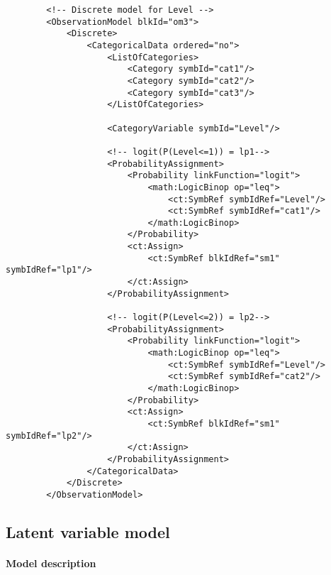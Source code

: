 \begin{lstlisting}
        <!-- Discrete model for Level -->
        <ObservationModel blkId="om3">
            <Discrete>
                <CategoricalData ordered="no">
                    <ListOfCategories>
                        <Category symbId="cat1"/>
                        <Category symbId="cat2"/>
                        <Category symbId="cat3"/>
                    </ListOfCategories>
                    
                    <CategoryVariable symbId="Level"/>
                    
                    <!-- logit(P(Level<=1)) = lp1-->
                    <ProbabilityAssignment>
                        <Probability linkFunction="logit">
                            <math:LogicBinop op="leq">
                                <ct:SymbRef symbIdRef="Level"/>
                                <ct:SymbRef symbIdRef="cat1"/>
                            </math:LogicBinop>
                        </Probability>
                        <ct:Assign>
                            <ct:SymbRef blkIdRef="sm1" symbIdRef="lp1"/>
                        </ct:Assign>
                    </ProbabilityAssignment>
                    
                    <!-- logit(P(Level<=2)) = lp2-->
                    <ProbabilityAssignment>
                        <Probability linkFunction="logit">
                            <math:LogicBinop op="leq">
                                <ct:SymbRef symbIdRef="Level"/>
                                <ct:SymbRef symbIdRef="cat2"/>
                            </math:LogicBinop>
                        </Probability>
                        <ct:Assign>
                            <ct:SymbRef blkIdRef="sm1" symbIdRef="lp2"/>
                        </ct:Assign>
                    </ProbabilityAssignment>
                </CategoricalData>
            </Discrete>
        </ObservationModel>
\end{lstlisting}



\subsection{Latent variable model}
\label{subsec:latentVariableModel}

\paragraph{Model description}


